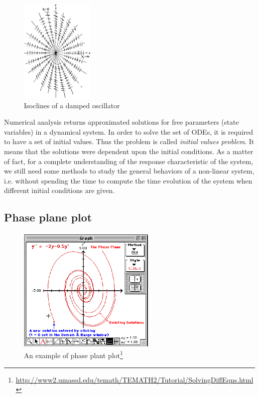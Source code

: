 \begin{figure}[hbt]
  \centerline{\includegraphics[height=5cm]{./images/damped_isoclines.eps}}
  \caption{Isoclines of a damped oscillator}
  \label{fig:damped_isocline}
\end{figure}


Numerical analysis returns approximated solutions for free parameters
(state variables) in a dynamical system. In order to solve the set of
ODEs, it is required to have a set of initial values. Thus the problem
is called {\it initial values problem}. It means that the solutions
were dependent upon the initial conditions. As a matter of fact, for a
complete understanding of the response characteristic of the system,
we still need some methods to study the general behaviors of a
non-linear system, i.e. without spending the time to compute the time
evolution of the system when different initial conditions are
given. 

\subsection{Phase plane plot}
\label{sec:phase-plane-plot}



\begin{figure}[hbt]
 \centerline{\includegraphics[height=6cm]{./images/phaseplane_plot.eps}}
\caption{An example of phase plant plot\footnote{\url{http://www2.umassd.edu/temath/TEMATH2/Tutorial/SolvingDiffEqns.html}}}
\label{fig:phaseplane_plot}
\end{figure}

